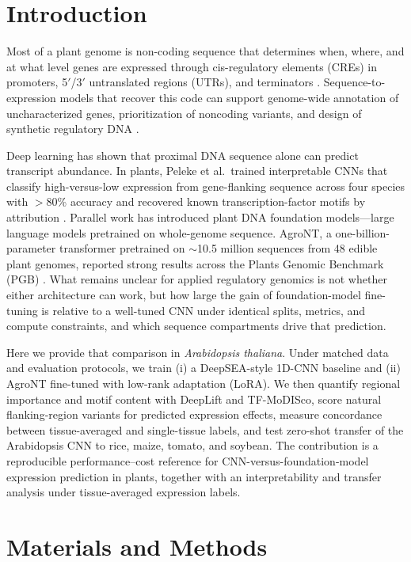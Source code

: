 \documentclass[genes,article,submit,moreauthors,pdftex]{Definitions/mdpi}
\begin{document}
\section{Introduction}
Most of a plant genome is non-coding sequence that determines when, where, and at what level genes are expressed through cis-regulatory elements (CREs) in promoters, 5$'$/3$'$ untranslated regions (UTRs), and terminators \cite{marand2023}. Sequence-to-expression models that recover this code can support genome-wide annotation of uncharacterized genes, prioritization of noncoding variants, and design of synthetic regulatory DNA \cite{hu2023}.

Deep learning has shown that proximal DNA sequence alone can predict transcript abundance. In plants, Peleke et al.\ trained interpretable CNNs that classify high-versus-low expression from gene-flanking sequence across four species with $>$80\% accuracy and recovered known transcription-factor motifs by attribution \cite{peleke2024}. Parallel work has introduced plant DNA foundation models---large language models pretrained on whole-genome sequence. AgroNT, a one-billion-parameter transformer pretrained on $\sim$10.5 million sequences from 48 edible plant genomes, reported strong results across the Plants Genomic Benchmark (PGB) \cite{mendoza2024,pgb2024}. What remains unclear for applied regulatory genomics is not whether either architecture can work, but how large the gain of foundation-model fine-tuning is relative to a well-tuned CNN under identical splits, metrics, and compute constraints, and which sequence compartments drive that prediction.

Here we provide that comparison in \emph{Arabidopsis thaliana}. Under matched data and evaluation protocols, we train (i) a DeepSEA-style 1D-CNN baseline and (ii) AgroNT fine-tuned with low-rank adaptation (LoRA). We then quantify regional importance and motif content with DeepLift and TF-MoDISco, score natural flanking-region variants for predicted expression effects, measure concordance between tissue-averaged and single-tissue labels, and test zero-shot transfer of the Arabidopsis CNN to rice, maize, tomato, and soybean. The contribution is a reproducible performance--cost reference for CNN-versus-foundation-model expression prediction in plants, together with an interpretability and transfer analysis under tissue-averaged expression labels.

\section{Materials and Methods}
\end{document}

